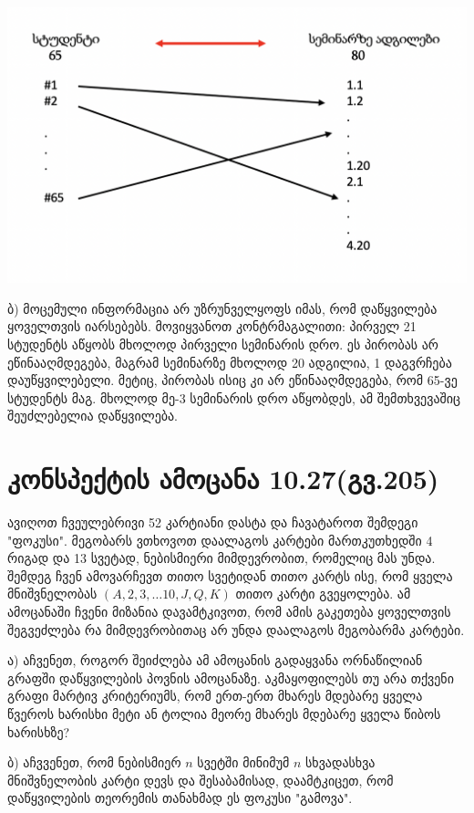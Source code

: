 \documentclass[a4paper, 11pt]{article}
\begin{document}
\begin{sloppypar}
\begin{center}
\includegraphics[scale = 0.5]{2.png}
\end{center}

ბ) მოცემული ინფორმაცია არ უზრუნველყოფს იმას, რომ დაწყვილება ყოველთვის იარსებებს. მოვიყვანოთ კონტრმაგალითი: პირველ 21 სტუდენტს აწყობს მხოლოდ პირველი სემინარის დრო. ეს პირობას არ ეწინააღმდეგება, მაგრამ სემინარზე მხოლოდ 20 ადგილია, 1 დაგვრჩება დაუწყვილებელი. მეტიც, პირობას ისიც კი არ ეწინააღმდეგება, რომ 65-ვე სტუდენტს მაგ. მხოლოდ მე-3 სემინარის დრო აწყობდეს, ამ შემთხვევაშიც შეუძლებელია დაწყვილება.

\section{კონსპექტის ამოცანა 10.27(გვ.205)}

ავიღოთ ჩვეულებრივი 52 კარტიანი დასტა და ჩავატაროთ შემდეგი "ფოკუსი". მეგობარს ვთხოვოთ დაალაგოს კარტები მართკუთხედში 4 რიგად და 13 სვეტად, ნებისმიერი მიმდევრობით, რომელიც მას უნდა. შემდეგ ჩვენ ამოვარჩევთ თითო სვეტიდან თითო კარტს ისე, რომ ყველა მნიშვნელობას $(A, 2, 3,\dots 10, J, Q, K)$ თითო კარტი გვეყოლება. ამ ამოცანაში ჩვენი მიზანია დავამტკივოთ, რომ ამის გაკეთება ყოველთვის შეგვეძლება რა მიმდევრობითაც არ უნდა დაალაგოს მეგობარმა კარტები.

ა) აჩვენეთ, როგორ შეიძლება ამ ამოცანის გადაყვანა ორნაწილიან გრაფში დაწყვილების პოვნის ამოცანაზე. აკმაყოფილებს თუ არა თქვენი გრაფი მარტივ კრიტერიუმს, რომ ერთ-ერთ მხარეს მდებარე ყველა წვეროს ხარისხი მეტი ან ტოლია მეორე მხარეს მდებარე ყველა წიბოს ხარისხზე?

ბ) აჩვვენეთ, რომ ნებისმიერ $n$ სვეტში მინიმუმ $n$ სხვადასხვა მნიშვნელობის კარტი დევს და შესაბამისად, დაამტკიცეთ, რომ დაწყვილების თეორემის თანახმად ეს ფოკუსი "გამოვა".


\end{sloppypar}
\end{document}
